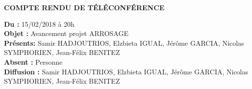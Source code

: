 \documentclass[11pt,a4paper,french,twoside,openright]{article}
\begin{document}
\pagestyle{fancy}

\begin{center}\bfseries\huge
COMPTE RENDU DE TÉLÉCONFÉRENCE %
\end{center}

\small
\noindent
\textbf{Du :} 15/02/2018 à 20h \\
\textbf{Objet :} Avancement projet ARROSAGE \\
\textbf{Présents:} Samir HADJOUTRIOS, Elzbieta IGUAL, Jérôme GARCIA, Nicolas SYMPHORIEN, Jean-Félix BENITEZ \\
\textbf{Absent :} Personne \\
\textbf{Diffusion :} Samir HADJOUTRIOS, Elzbieta IGUAL, Jérôme GARCIA, Nicolas SYMPHORIEN, Jean-Félix BENITEZ\\
\normalsize

\hrulefill
\end{document}
